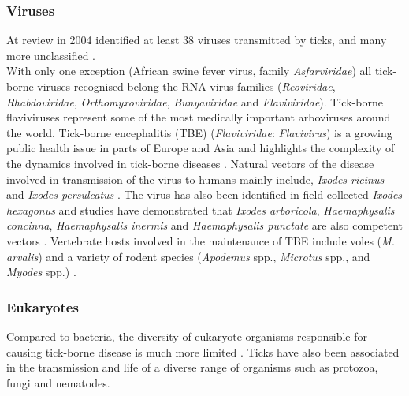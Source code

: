 \documentclass[a4paper, nobind]{templates/ociamthesis}
\begin{document}
\hypertarget{viruses}{%
\subsubsection{Viruses}\label{viruses}}

At review in 2004 identified at least 38 viruses transmitted by ticks, and many more unclassified \autocite{labudaTickborneViruses2004}.\\
With only one exception (African swine fever virus, family \emph{Asfarviridae}) all tick-borne viruses recognised belong the RNA virus families (\emph{Reoviridae}, \emph{Rhabdoviridae}, \emph{Orthomyxoviridae}, \emph{Bunyaviridae} and \emph{Flaviviridae}).
Tick-borne flaviviruses represent some of the most medically important arboviruses around the world.
Tick-borne encephalitis (TBE) (\emph{Flaviviridae}: \emph{Flavivirus}) is a growing public health issue in parts of Europe and Asia and highlights the complexity of the dynamics involved in tick-borne diseases \autocite{gritsunTickborneEncephalitis2003}.
Natural vectors of the disease involved in transmission of the virus to humans mainly include, \emph{Ixodes ricinus} and \emph{Ixodes persulcatus} \autocite{labudaTickborneViruses2004,sussTickborneEncephalitis20102011}.
The virus has also been identified in field collected \emph{Ixodes hexagonus} and studies have demonstrated that \emph{Ixodes arboricola}, \emph{Haemaphysalis concinna}, \emph{Haemaphysalis inermis} and \emph{Haemaphysalis punctate} are also competent vectors \autocite{gresikovaTickborneEncephalitis1998}.
Vertebrate hosts involved in the maintenance of TBE include voles (\emph{M. arvalis}) and a variety of rodent species (\emph{Apodemus} spp., \emph{Microtus} spp., and \emph{Myodes} spp.) \autocite{achaziRodentsSentinelsPrevalence2011}.

\hypertarget{eukaryotes}{%
\subsubsection{Eukaryotes}\label{eukaryotes}}

Compared to bacteria, the diversity of eukaryote organisms responsible for causing tick-borne disease is much more limited \autocite{tokarzDiscoverySurveillanceTickBorne2021}.
Ticks have also been associated in the transmission and life of a diverse range of organisms such as protozoa, fungi and nematodes.
\end{document}
